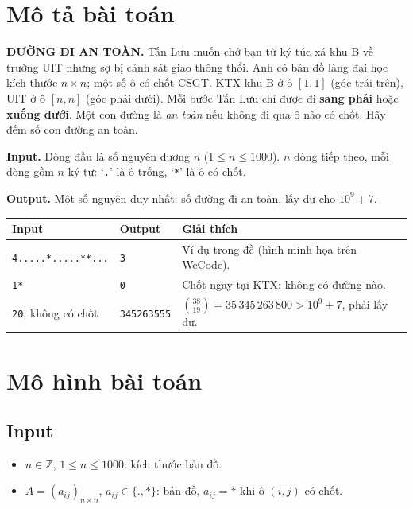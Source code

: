 \documentclass[12pt,a4paper]{report}
\begin{document}
\chapter{Mô tả bài toán}
\begin{note}
\textbf{ĐƯỜNG ĐI AN TOÀN.} Tấn Lưu muốn chở bạn từ ký túc xá khu B về trường UIT nhưng sợ bị cảnh sát giao thông thổi. Anh có bản đồ làng đại học kích thước $n\times n$; một số ô có chốt CSGT. KTX khu B ở ô $[1,1]$ (góc trái trên), UIT ở ô $[n,n]$ (góc phải dưới). Mỗi bước Tấn Lưu chỉ được đi \textbf{sang phải} hoặc \textbf{xuống dưới}. Một con đường là \emph{an toàn} nếu không đi qua ô nào có chốt. Hãy đếm số con đường an toàn.

\textbf{Input.} Dòng đầu là số nguyên dương $n$ ($1\le n\le 1000$). $n$ dòng tiếp theo, mỗi dòng gồm $n$ ký tự: `\texttt{.}' là ô trống, `\texttt{*}' là ô có chốt.

\textbf{Output.} Một số nguyên duy nhất: số đường đi an toàn, lấy dư cho $10^9+7$.
\end{note}

\begin{center}
\begin{tabular}{p{4.0cm} p{2.4cm} p{7.4cm}}
\toprule
\textbf{Input} & \textbf{Output} & \textbf{Giải thích}\\\midrule
\texttt{4}\newline\texttt{....}\newline\texttt{.*..}\newline\texttt{...*}\newline\texttt{*...} & \texttt{3} & Ví dụ trong đề (hình minh họa trên WeCode).\\\midrule
\texttt{1}\newline\texttt{*} & \texttt{0} & Chốt ngay tại KTX: không có đường nào.\\\midrule
\texttt{20}, không có chốt & \texttt{345263555} & $\binom{38}{19}=35\,345\,263\,800 > 10^9+7$, phải lấy dư.\\
\bottomrule
\end{tabular}
\end{center}

\chapter{Mô hình bài toán}
\section{Input}
\begin{itemize}
  \item $n \in \mathbb{Z}$, $1\le n\le 1000$: kích thước bản đồ.
  \item $A=(a_{ij})_{n\times n}$, $a_{ij}\in\{\texttt{.},\texttt{*}\}$: bản đồ, $a_{ij}=\texttt{*}$ khi ô $(i,j)$ có chốt.
\end{itemize}
\end{document}
